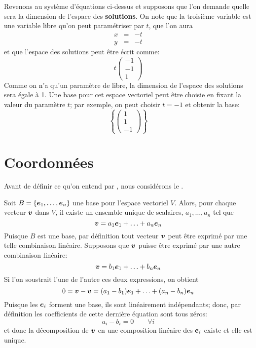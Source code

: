 Revenons au système d'équations ci-dessus et supposons que l'on demande quelle sera
la dimension de l'espace des \textbf{solutions}.  On note que la troisième variable
est une variable libre qu'on peut paramétriser par $t$, que l'on aura
\[
\begin{matrix}
x &=& -t \\
y &=& -t
\end{matrix}
\]
 et que l'espace des solutions
peut être écrit comme:
\[
t\begin{pmatrix}
-1 \\
-1 \\
1
\end{pmatrix}
\]
Comme on n'a qu'un paramètre de libre, la dimension de l'espace des solutions sera
égale à 1.  Une base pour cet espace vectoriel peut être choisie en fixant la valeur
du paramètre $t$; par exemple, on peut choisir $t=-1$ et obtenir la base:
\[
\left\{\begin{pmatrix}
1 \\ 1 \\ -1
\end{pmatrix}
\right\}
\]


\section{Coordonnées}
Avant de définir ce qu'on entend par , nous considérons
le .
\begin{theo}
Soit $B = \{\boldsymbol{e}_1, \ldots, \boldsymbol{e}_n\}$ une base pour l'espace vectoriel $V$. 
Alors, pour chaque vecteur $\boldsymbol{v}$ dans $V$, il existe un ensemble unique de
scalaires, $a_1, \ldots, a_n$ tel que 
\[
\boldsymbol{v} = a_1 \boldsymbol{e}_1 + \ldots + a_n \boldsymbol{e}_n
\]
\proof
Puisque $B$ est une base, par définition tout vecteur $\boldsymbol{v}$ peut être exprimé
par une telle combinaison linéaire.
Supposons que $\boldsymbol{v}$ puisse être exprimé par une autre combinaison linéaire:
\[
\boldsymbol{v} = b_1 \boldsymbol{e}_1 + \ldots + b_n \boldsymbol{e}_n
\]
Si l'on soustrait l'une de l'autre ces deux expressions, on obtient
\[
0 = \boldsymbol{v} - \boldsymbol{v} = (a_1 - b_1) \boldsymbol{e}_1 + \ldots + (a_n - b_n)\boldsymbol{e}_n
\]
Puisque les $\boldsymbol{e}_i$ forment une base, ils sont linéairement indépendants; 
donc, par définition les coefficients de cette dernière équation sont tous zéros:
\[
a_i - b_i = 0 \qquad \forall i
\]
et donc la décomposition de $\boldsymbol{v}$ en une composition linéaire des $\boldsymbol{e}_i$ existe et elle est unique.
\end{theo}

